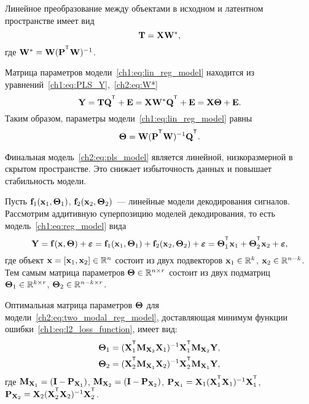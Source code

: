 \documentclass[11pt, a5paper]{dissert}
\begin{document}
Линейное преобразование между объектами в исходном и латентном пространстве имеет вид
\begin{equation}
	\mathbf{T} = \mathbf{X} \mathbf{W}^*,
	\label{ch2:eq:W*}
\end{equation}
где $\bW^* = \bW (\bP^{\T} \bW)^{-1}$. 

Матрица параметров модели~\ref{ch1:eq:lin_reg_model} находится из уравнений~\eqref{ch1:eq:PLS_Y},~\eqref{ch2:eq:W*}
\begin{equation}
	\bY = \bT \bQ^{\T} + \bE = \bX \bW^* \bQ^{\T} + \bE = \bX \bTheta + \bE.
	\label{ch2:eq:pls_model}
\end{equation}
Таким образом, параметры модели~\eqref{ch1:eq:lin_reg_model} равны
\begin{equation*}
	\bTheta = \bW (\bP^{\T} \bW)^{-1} \bQ^{\T}.
\end{equation*}

Финальная модель~\eqref{ch2:eq:pls_model} является линейной, низкоразмерной в скрытом пространстве. 
Это снижает избыточность данных и повышает стабильность модели.

Пусть $\mathbf{f}_1(\mathbf{x}_1, \boldsymbol{\Theta}_1)$, $\mathbf{f}_2(\mathbf{x}_2, \boldsymbol{\Theta}_2)$~--- линейные модели декодирования сигналов. 
Рассмотрим аддитивную суперпозицию моделей декодирования, то есть модель~\eqref{ch1:eq:reg_model} вида
\begin{equation}
	\bY = \mathbf{f}(\bx, \bTheta) + \bepsilon = \mathbf{f}_1(\bx_1, \bTheta_1) + \mathbf{f}_2(\bx_2, \bTheta_2) + \bepsilon = \bTheta_1^{\T} \bx_1 + \bTheta_2^{\T} \bx_2 + \bepsilon,
	\label{ch2:eq:two_modal_reg_model}
\end{equation}
где объект $\mathbf{x} = [\mathbf{x}_1, \mathbf{x}_2] \in \mathbb{R}^n$ состоит из двух подвекторов $\mathbf{x}_1 \in \mathbb{R}^k$, $\mathbf{x}_2 \in \mathbb{R}^{n - k}$. Тем самым матрица параметров $\boldsymbol{\Theta} \in \mathbb{R}^{n \times r}$ состоит из двух подматриц $\boldsymbol{\Theta}_1 \in \mathbb{R}^{k \times r}$, $\boldsymbol{\Theta}_2 \in \mathbb{R}^{n - k \times r}$. 

\begin{statement}
	\label{ch2:stat:two_modal_params}
	Оптимальная матрица параметров $\boldsymbol{\Theta}$ для модели~\eqref{ch2:eq:two_modal_reg_model}, доставляющая минимум функции ошибки~\eqref{ch1:eq:l2_loss_function}, имеет вид:
	\begin{align*}
		\bTheta_1 &= (\bX_1^{\T} \bM_{\bX_2} \bX_1)^{-1} \bX_1^{\T} \bM_{\bX_2} \bY, \\
		\bTheta_2 &= (\bX_2^{\T} \bM_{\bX_1} \bX_2)^{-1} \bX_2^{\T} \bM_{\bX_1} \bY,
	\end{align*}
	где $\mathbf{M}_{\mathbf{X}_1} = (\mathbf{I} - \mathbf{P}_{\mathbf{X}_1})$, $\mathbf{M}_{\mathbf{X}_2} = (\mathbf{I} - \mathbf{P}_{\mathbf{X}_2})$, $\bP_{\bX_1} = \bX_1 (\bX_1^{\T} \bX_1)^{-1} \bX_1^{\T}$, $\bP_{\bX_2} = \bX_2 (\bX_2^{\T} \bX_2)^{-1} \bX_2^{\T}$.
\end{statement}
\end{document}

